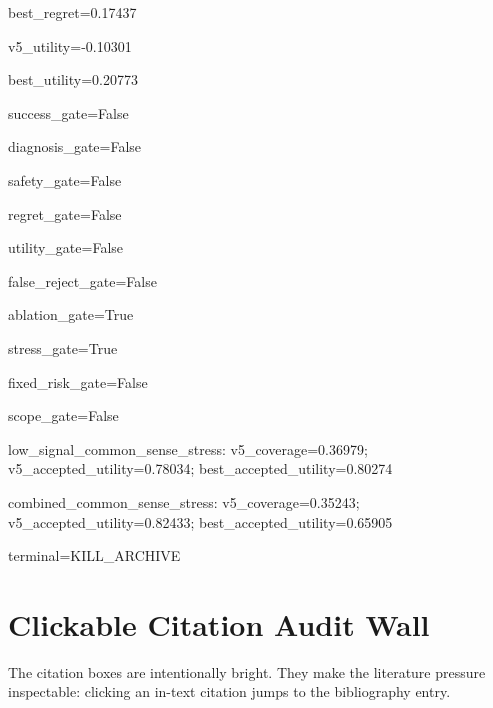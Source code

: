 \documentclass{article}
\begin{document}
\noindent best\_regret=0.17437\par
\noindent v5\_utility=-0.10301\par
\noindent best\_utility=0.20773\par
\noindent success\_gate=False\par
\noindent diagnosis\_gate=False\par
\noindent safety\_gate=False\par
\noindent regret\_gate=False\par
\noindent utility\_gate=False\par
\noindent false\_reject\_gate=False\par
\noindent ablation\_gate=True\par
\noindent stress\_gate=True\par
\noindent fixed\_risk\_gate=False\par
\noindent scope\_gate=False\par
\noindent low\_signal\_common\_sense\_stress: v5\_coverage=0.36979; v5\_accepted\_utility=0.78034; best\_accepted\_utility=0.80274\par
\noindent combined\_common\_sense\_stress: v5\_coverage=0.35243; v5\_accepted\_utility=0.82433; best\_accepted\_utility=0.65905\par
\noindent terminal=KILL\_ARCHIVE\par
\endgroup

\clearpage
\section{Clickable Citation Audit Wall}
The citation boxes are intentionally bright. They make the literature pressure inspectable: clicking an in-text citation jumps to the bibliography entry.
\end{document}
